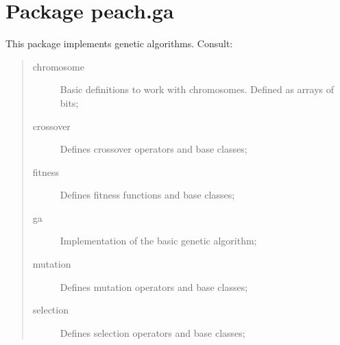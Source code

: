 %
%
%


\section{Package peach.ga}

    \label{peach:ga}

This package implements genetic algorithms. Consult:
\begin{quote}
\begin{description}
\item[{chromosome}] %

Basic definitions to work with chromosomes. Defined as arrays of bits;

\item[{crossover}] %

Defines crossover operators and base classes;

\item[{fitness}] %

Defines fitness functions and base classes;

\item[{ga}] %

Implementation of the basic genetic algorithm;

\item[{mutation}] %

Defines mutation operators and base classes;

\item[{selection}] %

Defines selection operators and base classes;

\end{description}
\end{quote}

